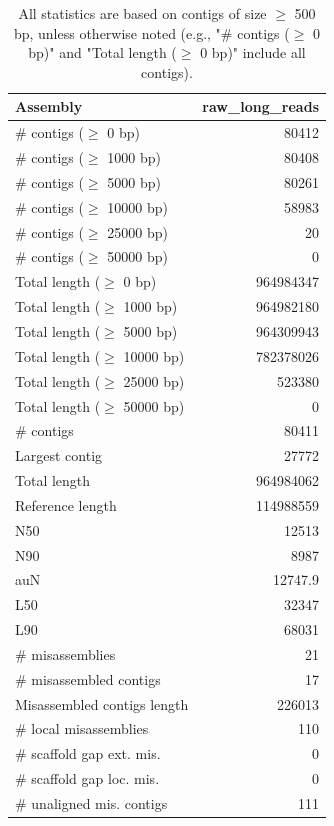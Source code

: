 \documentclass[12pt,a4paper]{article}
\begin{document}
\begin{table}[ht]
\begin{center}
\caption{All statistics are based on contigs of size $\geq$ 500 bp, unless otherwise noted (e.g., "\# contigs ($\geq$ 0 bp)" and "Total length ($\geq$ 0 bp)" include all contigs).}
\begin{tabular}{|l*{1}{|r}|}
\hline
Assembly & raw\_long\_reads \\ \hline
\# contigs ($\geq$ 0 bp) & 80412 \\ \hline
\# contigs ($\geq$ 1000 bp) & 80408 \\ \hline
\# contigs ($\geq$ 5000 bp) & 80261 \\ \hline
\# contigs ($\geq$ 10000 bp) & 58983 \\ \hline
\# contigs ($\geq$ 25000 bp) & 20 \\ \hline
\# contigs ($\geq$ 50000 bp) & 0 \\ \hline
Total length ($\geq$ 0 bp) & 964984347 \\ \hline
Total length ($\geq$ 1000 bp) & 964982180 \\ \hline
Total length ($\geq$ 5000 bp) & 964309943 \\ \hline
Total length ($\geq$ 10000 bp) & 782378026 \\ \hline
Total length ($\geq$ 25000 bp) & 523380 \\ \hline
Total length ($\geq$ 50000 bp) & 0 \\ \hline
\# contigs & 80411 \\ \hline
Largest contig & 27772 \\ \hline
Total length & 964984062 \\ \hline
Reference length & 114988559 \\ \hline
N50 & 12513 \\ \hline
N90 & 8987 \\ \hline
auN & 12747.9 \\ \hline
L50 & 32347 \\ \hline
L90 & 68031 \\ \hline
\# misassemblies & 21 \\ \hline
\# misassembled contigs & 17 \\ \hline
Misassembled contigs length & 226013 \\ \hline
\# local misassemblies & 110 \\ \hline
\# scaffold gap ext. mis. & 0 \\ \hline
\# scaffold gap loc. mis. & 0 \\ \hline
\# unaligned mis. contigs & 111 \\ \hline

\end{tabular}
\end{center}
\end{table}
\end{document}
